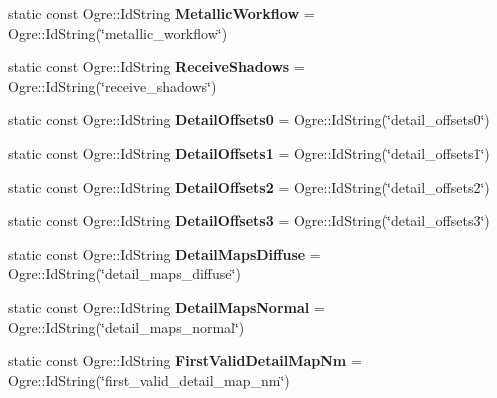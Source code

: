 \begin{DoxyCompactItemize}
static const Ogre\+::\+Id\+String {\bfseries Metallic\+Workflow} = Ogre\+::\+Id\+String(\char`\"{}metallic\+\_\+workflow\char`\"{})
\item 
\mbox{\label{struct_terrain_property_a98f5bc977de45a559dbf5d5e3c1e3c38}} 
static const Ogre\+::\+Id\+String {\bfseries Receive\+Shadows} = Ogre\+::\+Id\+String(\char`\"{}receive\+\_\+shadows\char`\"{})
\item 
\mbox{\label{struct_terrain_property_a15bbb0eaad4efe4b5b339c0b7b7ee2e4}} 
static const Ogre\+::\+Id\+String {\bfseries Detail\+Offsets0} = Ogre\+::\+Id\+String(\char`\"{}detail\+\_\+offsets0\char`\"{})
\item 
\mbox{\label{struct_terrain_property_a9b3e8a48445dac5ce7cac54905b8a484}} 
static const Ogre\+::\+Id\+String {\bfseries Detail\+Offsets1} = Ogre\+::\+Id\+String(\char`\"{}detail\+\_\+offsets1\char`\"{})
\item 
\mbox{\label{struct_terrain_property_a3c5a1b12221828b81aa299fea835fc82}} 
static const Ogre\+::\+Id\+String {\bfseries Detail\+Offsets2} = Ogre\+::\+Id\+String(\char`\"{}detail\+\_\+offsets2\char`\"{})
\item 
\mbox{\label{struct_terrain_property_af1e758c0b5680f59fe17fbc73b116510}} 
static const Ogre\+::\+Id\+String {\bfseries Detail\+Offsets3} = Ogre\+::\+Id\+String(\char`\"{}detail\+\_\+offsets3\char`\"{})
\item 
\mbox{\label{struct_terrain_property_abbf7f88e8da966c767bcf4aea5c61172}} 
static const Ogre\+::\+Id\+String {\bfseries Detail\+Maps\+Diffuse} = Ogre\+::\+Id\+String(\char`\"{}detail\+\_\+maps\+\_\+diffuse\char`\"{})
\item 
\mbox{\label{struct_terrain_property_ae09627b2abaced813e27ecdf710a0ea0}} 
static const Ogre\+::\+Id\+String {\bfseries Detail\+Maps\+Normal} = Ogre\+::\+Id\+String(\char`\"{}detail\+\_\+maps\+\_\+normal\char`\"{})
\item 
\mbox{\label{struct_terrain_property_aab108a9b0dbd22b8aa2a93c7d6c45b82}} 
static const Ogre\+::\+Id\+String {\bfseries First\+Valid\+Detail\+Map\+Nm} = Ogre\+::\+Id\+String(\char`\"{}first\+\_\+valid\+\_\+detail\+\_\+map\+\_\+nm\char`\"{})

\end{DoxyCompactItemize}
